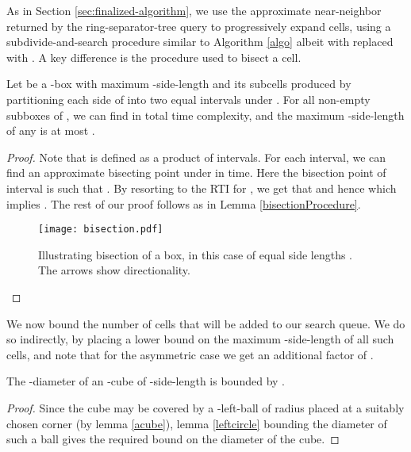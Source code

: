 \documentclass[11pt]{myclass}
\begin{document}
As in Section \ref{sec:finalized-algorithm}, we use the approximate near-neighbor returned by the ring-separator-tree query to progressively expand cells, using a subdivide-and-search procedure similar to Algorithm \ref{algo} albeit with 
 replaced with . A key difference is the procedure used to bisect a cell. 



\begin{lemma}\label{bisectionasymmetric}
Let  be a -box with maximum -side-length  and  its subcells 
produced by partitioning each side of  into two equal intervals under . For all non-empty subboxes  of , we can find  in  total time complexity, and the maximum -side-length of any  is at most .
\end{lemma}
\begin{proof}
 Note that  is defined as a product of  intervals. For each interval, we can find an approximate bisecting point 
under  in  time. Here the bisection point  of interval  is such that 
. By resorting to the RTI for , we get that  and hence  which implies . The rest of our proof follows as in Lemma \ref{bisectionProcedure}.

\begin{figure}[H]
  \begin{center}
    \texttt{[image: bisection.pdf]}
  \end{center}
  \caption{Illustrating bisection of a box, in this case of equal side lengths . The arrows show directionality. }
\end{figure}
\end{proof}


We now bound the number of cells that will be added to our search queue. 
We do so indirectly, by placing a lower bound on the maximum -side-length of all such cells, and note that for the
asymmetric case we get an additional factor of .


\begin{lemma}\label{adiamtolength}
The -diameter of an -cube  of -side-length  is bounded by . 
\end{lemma}
\begin{proof}
Since the cube may be covered by a -left-ball of radius  placed at a suitably chosen corner (by lemma \ref{acube}), lemma \ref{leftcircle} bounding the diameter of such a ball gives the required bound on the diameter
of the cube.
\end{proof}
\end{document}
